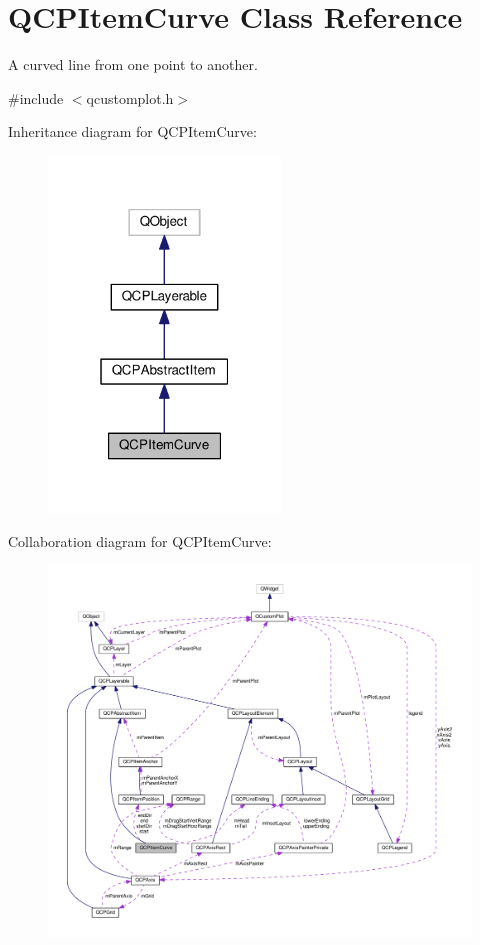 \hypertarget{classQCPItemCurve}{}\section{Q\+C\+P\+Item\+Curve Class Reference}
\label{classQCPItemCurve}


A curved line from one point to another.  




{\ttfamily \#include $<$qcustomplot.\+h$>$}



Inheritance diagram for Q\+C\+P\+Item\+Curve\+:\nopagebreak
\begin{figure}[H]
\begin{center}
\leavevmode
\includegraphics[width=175pt]{classQCPItemCurve__inherit__graph}
\end{center}
\end{figure}


Collaboration diagram for Q\+C\+P\+Item\+Curve\+:\nopagebreak
\begin{figure}[H]
\begin{center}
\leavevmode
\includegraphics[width=350pt]{classQCPItemCurve__coll__graph}
\end{center}
\end{figure}
